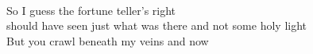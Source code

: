 \\
So I guess the fortune teller's right \\
should have seen just what was there and not some holy light \\
But you crawl beneath my veins and now \\
\\
